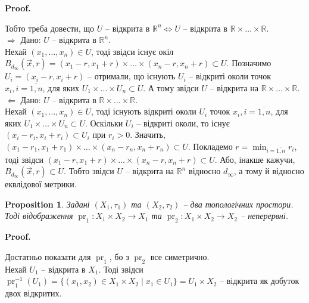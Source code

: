 \documentclass[a4paper, 10pt]{article}
\makeatletter
\def\rightproof{$\boxed{\Rightarrow}$ }
\def\leftproof{$\boxed{\Leftarrow}$ }
\theoremstyle{theoremdd}
\newtheorem{proposition}[theorem]{Proposition}
\DeclareMathOperator{\pr}{pr}
\renewenvironment{proof}[1][Proof.\\]{\par
\pushQED{\hfill \qed}%
\normalfont \topsep6\p@\@plus6\p@\relax
\trivlist
\item\relax
{\bfseries
#1\@addpunct{.}}\hspace\labelsep\ignorespaces
}{%
\popQED\endtrivlist\@endpefalse
}
\makeatother
\begin{document}
\begin{proof}
Тобто треба довести, що $U$ -- відкрита в $\mathbb{R}^n \iff U$ -- відкрита в $\mathbb{R} \times \dots \times \mathbb{R}$.\\
\rightproof Дано: $U$ -- відкрита в $\mathbb{R}^n$. \\
Нехай $(x_1,\dots,x_n) \in U$, тоді звідси існує окіл $B_{d_\infty}(\vec{x},r) = (x_1-r,x_1+r) \times \dots \times (x_n-r,x_n+r) \subset U$. Позначимо $U_i = (x_i-r,x_i+r)$ -- отримали, що існують $U_i$ -- відкриті околи точок $x_i, i = \overline{1,n}$, для яких $U_1 \times \dots \times U_n \subset U$. А тому звідси $U$ -- відкрита на $\mathbb{R} \times \dots \times \mathbb{R}$.
\bigskip \\
\leftproof Дано: $U$ -- відкрита в $\mathbb{R} \times \dots \times \mathbb{R}$.\\
Нехай $(x_1,\dots,x_n) \in U$, тоді існують відкриті околи $U_i$ точок $x_i, i = \overline{1,n}$, для яких $U_1 \times \dots \times U_n \subset U$. Оскільки $U_i$ -- відкриті околи, то існує $(x_i-r_i,x_i+r_i) \subset U_i$ при $r_i > 0$. Значить, $(x_1-r_1,x_1+r_1) \times \dots \times (x_n-r_n,x_n+r_n) \subset U$. Покладемо $r = \displaystyle\min_{i = \overline{1,n}} r_i$, тоді звідси $(x_1-r,x_1+r) \times \dots \times (x_n-r,x_n+r) \subset U$. Або, інакше кажучи, $B_{d_\infty}(\vec{x},r) \subset U$. Тобто звідси $U$ -- відкрита на $\mathbb{R}^n$ відносно $d_\infty$, а тому й відносно еквлідової метрики.
\end{proof}

\begin{proposition}
Задані $(X_1,\tau_1)$ та $(X_2,\tau_2)$ -- два топологічних простори. Тоді відображення $\pr_1 \colon X_1 \times X_2 \to X_1$ та $\pr_2 \colon X_1 \times X_2 \to X_2$ -- неперервні.
\begin{figure}[H]
\centering
{}
\end{figure}
\end{proposition}

\begin{proof}
Достатньо показати для $\pr_1$, бо з $\pr_2$ все симетрично.\\
Нехай $U_1$ -- відкрита в $X_1$. Тоді звідси $\pr_1^{-1}(U_1) = \{ (x_1,x_2) \in X_1 \times X_2 \mid x_1 \in U_1 \} = U_1 \times X_2$ -- відкрита як добуток двох відкритих.
\end{proof}
\end{document}
